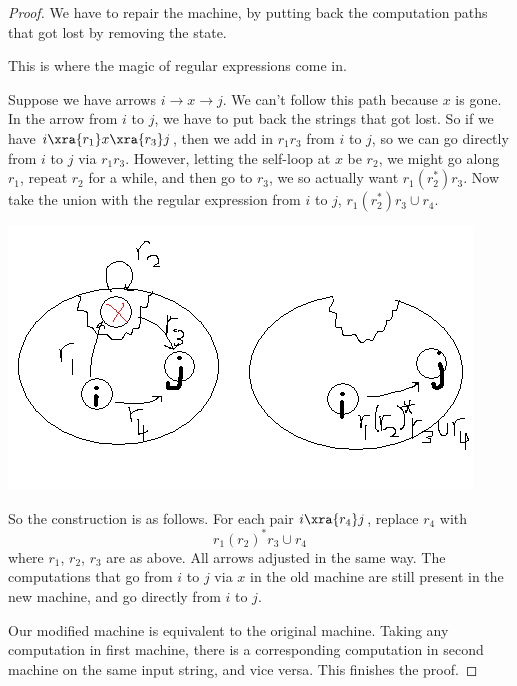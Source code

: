 \begin{proof}
We have to repair the machine, by putting back the computation paths that got lost by removing the state.

This is where the magic of regular expressions come in.

Suppose we have arrows $i\to x\to j$. We can't follow this path because $x$ is gone. In the arrow from $i$ to $j$, we have to put back the strings that got lost. So if we have $i\xra{r_1}x\xra{r_3} j$, then we add in $r_1r_3$ from $i$ to $j$, so we can go directly from $i$ to $j$ via $r_1r_3$. %
However, letting the self-loop at $x$ be $r_2$, we might go along $r_1$, repeat $r_2$ for a while, and then go to $r_3$, we so actually want $r_1(r_2^*)r_3$. Now take the union with the regular expression from $i$ to $j$, $r_1(r_2^*)r_3\cup r_4$.

\begin{center}
\includegraphics[scale=0.5]{3-5}
\end{center}

So the construction is as follows. For each pair $i\xra{r_4} j$, replace  $r_4$ with
\[
r_1(r_2)^*r_3\cup r_4
\]
where $r_1$, $r_2$, $r_3$ are as above.
All arrows adjusted in the same way. The computations that go from $i$ to $j$ via $x$ in the old machine are still present in the new machine, and go directly from $i$ to $j$. 

Our modified machine is equivalent to the original machine. Taking any computation in first machine, there is a corresponding computation in second machine %
on the same input string, and vice versa. This finishes the proof. %

\end{proof}
